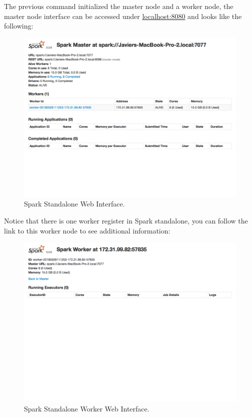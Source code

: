 \documentclass[]{book}
\theoremstyle{definition}
\theoremstyle{definition}
\theoremstyle{definition}
\theoremstyle{remark}
\begin{document}
The previous command initialized the master node and a worker node, the
master node interface can be accessed under
\href{http://localhost:8080}{localhost:8080} and looks like the
following:

\begin{figure}

{\centering \includegraphics[width=13.78in]{images/05-clusters-spark-standalone-web-ui} 

}

\caption{Spark Standalone Web Interface.}\label{fig:spark-standalone-web-ui}
\end{figure}

Notice that there is one worker register in Spark standalone, you can
follow the link to this worker node to see additional information:

\begin{figure}

{\centering \includegraphics[width=13.78in]{images/05-clusters-spark-standalone-web-ui-worker} 

}

\caption{Spark Standalone Worker Web Interface.}\label{fig:spark-standalone-web-ui-worker}
\end{figure}
\end{document}
